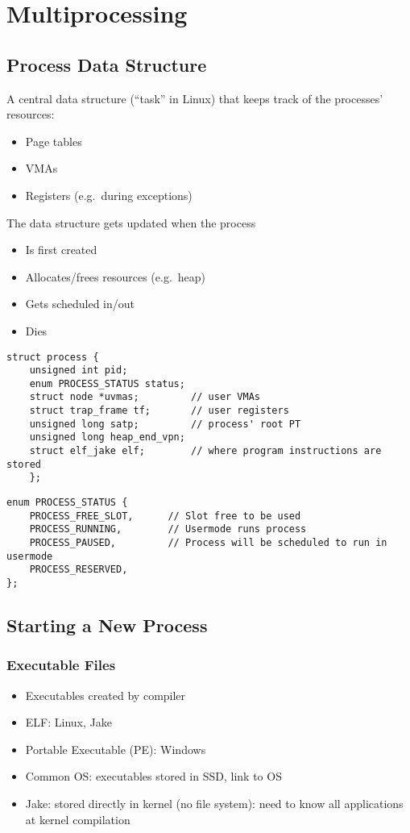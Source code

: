 \section{Multiprocessing}
\subsection{Process Data Structure}
A central data structure (``task'' in Linux) that keeps track of the processes' resources:
\begin{itemize}
    \item Page tables
    \item VMAs
    \item Registers (e.g.\ during exceptions)
\end{itemize}
The data structure gets updated when the process
\begin{itemize}
    \item Is first created
    \item Allocates/frees resources (e.g.\ heap)
    \item Gets scheduled in/out
    \item Dies
\end{itemize}

\newpar{}
\begin{lstlisting}[style=bright_C++]
struct process {
    unsigned int pid;
    enum PROCESS_STATUS status; 
    struct node *uvmas;         // user VMAs
    struct trap_frame tf;       // user registers
    unsigned long satp;         // process' root PT
    unsigned long heap_end_vpn;
    struct elf_jake elf;        // where program instructions are stored
    };
\end{lstlisting}
\newpar{}
\begin{lstlisting}[style=bright_C++]
enum PROCESS_STATUS {
    PROCESS_FREE_SLOT, 	    // Slot free to be used
    PROCESS_RUNNING, 	    // Usermode runs process
    PROCESS_PAUSED, 	    // Process will be scheduled to run in usermode
    PROCESS_RESERVED,
};
\end{lstlisting}

\subsection{Starting a New Process}
\subsubsection{Executable Files}
\begin{itemize}
    \item Executables created by compiler
    \item ELF: Linux, Jake
    \item Portable Executable (PE): Windows
    \item Common OS: executables stored in SSD, link to OS
    \item Jake: stored directly in kernel (no file system): need to know all applications at kernel compilation
\end{itemize}

